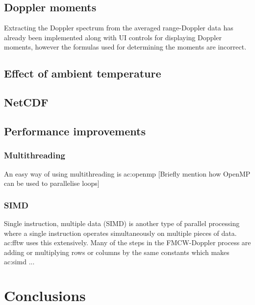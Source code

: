 \documentclass{article}
\begin{document}
\subsection{Doppler moments}
Extracting the Doppler spectrum from the averaged range-Doppler data has already been implemented along with UI controls for displaying Doppler moments, however the formulas used for determining the moments are incorrect.

\subsection{Effect of ambient temperature}
\subsection{NetCDF}

\subsection{Performance improvements}
\subsubsection{Multithreading}
An easy way of using multithreading is \acrshort{ac:openmp}
[Briefly mention how OpenMP can be used to parallelise loops]

\subsubsection{SIMD}
Single instruction, multiple data (SIMD) is another type of parallel processing where a single instruction operates simultaneously on multiple pieces of data. \acrshort{ac:fftw} uses this extensively. Many of the steps in the FMCW-Doppler process are adding or multiplying rows or columns by the same constants which makes \acrshort{ac:simd} ...

\section{Conclusions}

\clearpage
\printglossary
\printbibliography
\end{document}
